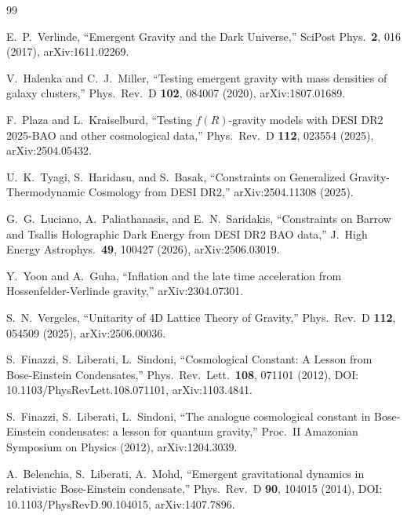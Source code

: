 \documentclass[aps,prd,reprint,nofootinbib,superscriptaddress]{revtex4-2}
\begin{document}
\begin{thebibliography}{99}

E.~P.~Verlinde,
``Emergent Gravity and the Dark Universe,''
SciPost Phys.\ \textbf{2}, 016 (2017), arXiv:1611.02269.

V.~Halenka and C.~J.~Miller,
``Testing emergent gravity with mass densities of galaxy clusters,''
Phys.\ Rev.\ D \textbf{102}, 084007 (2020), arXiv:1807.01689.

F.~Plaza and L.~Kraiselburd,
``Testing $f(R)$-gravity models with DESI DR2 2025-BAO and other
cosmological data,''
Phys.\ Rev.\ D \textbf{112}, 023554 (2025), arXiv:2504.05432.

U.~K.~Tyagi, S.~Haridasu, and S.~Basak,
``Constraints on Generalized Gravity-Thermodynamic Cosmology from
DESI DR2,'' arXiv:2504.11308 (2025).

G.~G.~Luciano, A.~Paliathanasis, and E.~N.~Saridakis,
``Constraints on Barrow and Tsallis Holographic Dark Energy from
DESI DR2 BAO data,'' J.~High Energy Astrophys.~\textbf{49}, 100427
(2026), arXiv:2506.03019.

Y.~Yoon and A.~Guha,
``Inflation and the late time acceleration from Hossenfelder-Verlinde
gravity,'' arXiv:2304.07301.

S.~N.~Vergeles, ``Unitarity of 4D Lattice Theory of Gravity,''
Phys.\ Rev.\ D \textbf{112}, 054509 (2025), arXiv:2506.00036.


S.~Finazzi, S.~Liberati, L.~Sindoni,
``Cosmological Constant: A Lesson from Bose-Einstein Condensates,''
Phys.\ Rev.\ Lett.\ \textbf{108}, 071101 (2012),
DOI: 10.1103/PhysRevLett.108.071101, arXiv:1103.4841.

S.~Finazzi, S.~Liberati, L.~Sindoni,
``The analogue cosmological constant in Bose-Einstein condensates:
a lesson for quantum gravity,''
Proc.\ II Amazonian Symposium on Physics (2012), arXiv:1204.3039.

A.~Belenchia, S.~Liberati, A.~Mohd,
``Emergent gravitational dynamics in relativistic Bose-Einstein
condensate,''
Phys.\ Rev.\ D \textbf{90}, 104015 (2014),
DOI: 10.1103/PhysRevD.90.104015, arXiv:1407.7896.


\end{thebibliography}
\end{document}

